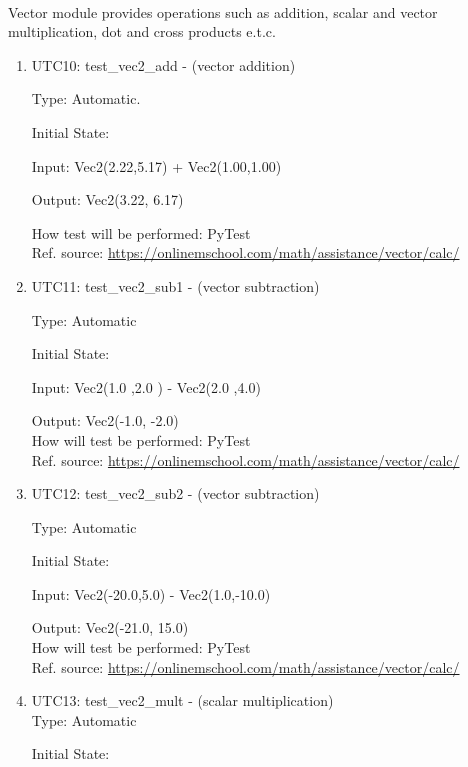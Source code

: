 \documentclass[12pt, titlepage]{article}
\begin{document}
\paragraph{}
Vector module provides operations such as addition, scalar and vector multiplication, dot and cross products e.t.c.
\begin{enumerate}
	
	\item{UTC10}{: test\_vec2\_add - (vector addition) \\}
	
	Type: Automatic.
	
	Initial State: 
	
	Input: Vec2(2.22,5.17) + Vec2(1.00,1.00)
	
	Output: Vec2(3.22, 6.17)
	
	How test will be performed: PyTest \\
	Ref. source: \url{https://onlinemschool.com/math/assistance/vector/calc/}
	
	\item{UTC11}{: test\_vec2\_sub1 - (vector subtraction)\\}
	
	Type: Automatic
	
	Initial State: 
	
	Input: Vec2(1.0 ,2.0 ) - Vec2(2.0 ,4.0)
	
	Output: Vec2(-1.0, -2.0)\\
	How will test be performed: PyTest\\
	Ref. source: \url{https://onlinemschool.com/math/assistance/vector/calc/}
	
	\item{UTC12}{: test\_vec2\_sub2 - (vector subtraction)\\}
	
	Type: Automatic
	
	Initial State: 
	
	Input: Vec2(-20.0,5.0) - Vec2(1.0,-10.0)
	
	Output: Vec2(-21.0, 15.0)\\
	How will test be performed: PyTest\\
	Ref. source: \url{https://onlinemschool.com/math/assistance/vector/calc/}
	
	\item{UTC13}{: test\_vec2\_mult} - (scalar multiplication)\\
	
	Type: Automatic
	
	Initial State: 
	

\end{enumerate}
\end{document}
